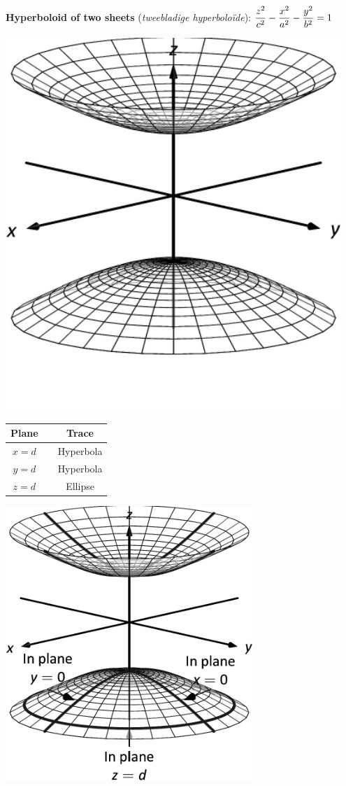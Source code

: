 \ifcalculus\pagebreak\fi
\textbf{Hyperboloid of two sheets} (\textit{tweebladige hyperbolo\"ide}): \quad$\displaystyle \frac{z^2}{c^2}-\frac{x^2}{a^2}-\frac{y^2}{b^2}=1$

\begin{minipage}[c]{.3\linewidth}
\vskip0pt
\includegraphics[width=0.95\textwidth]{fig_ana_geo_21a}
\end{minipage}
\begin{minipage}[c]{.25\linewidth}
\vskip0pt\hskip 10pt
\begin{tabular}[]{ccc}
\textbf{Plane}  & & \textbf{Trace} \\ \hline
$x=d$ & & Hyperbola \\
$y=d$ & & Hyperbola\\
$z=d$ & & Ellipse
\end{tabular}
\end{minipage}%
\begin{minipage}[c]{.45\linewidth}
\includegraphics[width=0.7\textwidth]{fig_ana_geo_21b}
\end{minipage}

